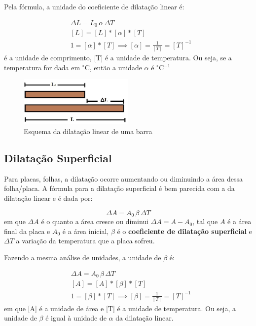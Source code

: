 \documentclass[12pt]{extarticle}
\newcommand{\<}{\langle}
\newcommand{\grad}{$^\circ$}
\renewcommand{\>}{\rangle}
\theoremstyle{definition}
\begin{document}
Pela fórmula, a unidade do coeficiente de dilatação linear é:

\begin{equation}
    \begin{split}
        &\Delta L = L_0\, \alpha\, \Delta T\\
        &[L] = [L]*[\alpha]*[T] \\
        & 1 =[\alpha]*[T] \implies [\alpha] = \frac{1}{[T]} = [T]^{-1}
    \end{split}
\end{equation}
\noindent [L] é a unidade de comprimento, [T] é a unidade de temperatura. Ou seja, se a temperatura for dada em \grad C, então a unidade $\alpha$ é \grad C$^{-1}$

\begin{figure}[H]
    \centering
    \includegraphics[width=0.5\textwidth]{dilatação linear de uma barra.jpg}
    \caption{Esquema da dilatação linear de uma barra}
    \label{fig:dilatacao_lin}
\end{figure}

\subsection{Dilatação Superficial}

Para placas, folhas, a dilatação ocorre aumentando ou diminuindo a área dessa folha/placa. A fórmula para a dilatação superficial é bem parecida com a da dilatação linear e é dada por:

\begin{equation}
    \Delta A = A_0\,\beta\, \Delta T
\end{equation}
\noindent em que $\Delta A$ é o quanto a área cresce ou diminui $\Delta A = A - A_0$, tal que $A$ é a área final da placa e $A_0$ é a área inicial, $\beta$ é o \textbf{coeficiente de dilatação superficial} e $\Delta T$ a variação da temperatura que a placa sofreu.

Fazendo a mesma análise de unidades, a unidade de $\beta$ é:

\begin{equation}
    \begin{split}
        &\Delta A = A_0\, \beta\,\Delta T\\
        &[A] = [A]*[\beta]*[T]\\
        &1 = [\beta]*[T] \implies [\beta] = \frac{1}{[T]} = [T]^{-1}
    \end{split}
\end{equation}
\noindent em que [A] é a unidade de área e [T] é a unidade de temperatura. Ou seja, a unidade de $\beta$ é igual à unidade de $\alpha$ da dilatação linear.
\end{document}
